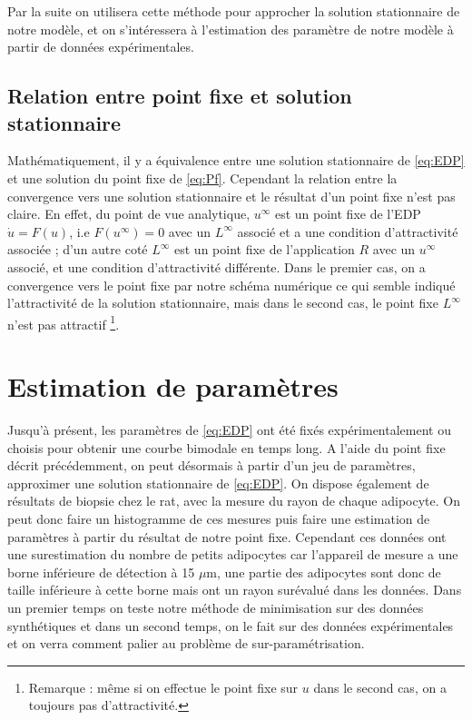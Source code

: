 \documentclass[a4paper,fleqn,leqno]{article}
\begin{document}
Par la suite on utilisera cette méthode pour approcher la solution stationnaire de notre modèle, et on s’intéressera à l'estimation des paramètre de notre modèle à partir de données expérimentales.




\subsection{Relation entre point fixe et solution stationnaire}


Mathématiquement, il y a équivalence entre une solution stationnaire de \eqref{eq:EDP} et une solution du point fixe de \eqref{eq:Pf}. Cependant la relation entre la convergence vers une solution stationnaire et le résultat d'un point fixe n'est pas claire. En effet, du point de vue analytique, $u^{\infty}$ est un point fixe de l'EDP $\dot{u} = F(u)$, i.e $F(u^{\infty}) = 0$ avec un $L^{\infty}$ associé et a une condition d'attractivité associée ; d'un autre coté $L^{\infty}$ est un point fixe de l'application $R$ avec un $u^{\infty}$ associé, et une condition d'attractivité différente. Dans le premier cas, on a convergence vers le point fixe par notre schéma numérique ce qui semble indiqué l'attractivité de la solution stationnaire, mais dans le second cas, le point fixe $L^\infty$ n'est pas attractif \footnote{Remarque : même si on effectue le point fixe sur $u$ dans le second cas, on a toujours pas d'attractivité.}.






\section{Estimation de paramètres}

Jusqu'à présent, les paramètres de \eqref{eq:EDP} ont été fixés expérimentalement ou choisis pour obtenir une courbe bimodale en temps long. A l'aide du point fixe décrit précédemment, on peut désormais à partir d'un jeu de paramètres, approximer une solution stationnaire de \eqref{eq:EDP}. On dispose également de résultats de biopsie chez le rat, avec la mesure du rayon de chaque adipocyte. On peut donc faire un histogramme de ces mesures puis faire une estimation de paramètres à partir du résultat de notre point fixe. Cependant ces données ont une surestimation du nombre de petits adipocytes car l'appareil de mesure a une borne inférieure de détection à 15 $\mu$m, une partie des adipocytes sont donc de taille inférieure à cette borne mais ont un rayon surévalué dans les données. Dans un premier temps on teste notre méthode de minimisation sur des données synthétiques et dans un second temps, on le fait sur des données expérimentales et on verra comment palier au problème de sur-paramétrisation.
\end{document}
